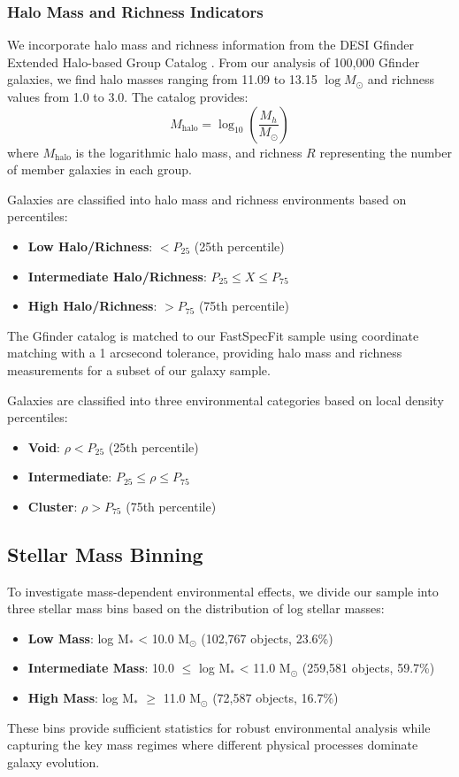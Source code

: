 \documentclass[twocolumn]{aastex701}
\begin{document}
\subsubsection{Halo Mass and Richness Indicators}

We incorporate halo mass and richness information from the DESI Gfinder Extended Halo-based Group Catalog \citep{Yang2021}. From our analysis of 100,000 Gfinder galaxies, we find halo masses ranging from 11.09 to 13.15 $\log M_\odot$ and richness values from 1.0 to 3.0. The catalog provides:
\begin{equation}
M_{\text{halo}} = \log_{10}\left(\frac{M_h}{M_\odot}\right)
\end{equation}
where $M_{\text{halo}}$ is the logarithmic halo mass, and richness $R$ representing the number of member galaxies in each group.

Galaxies are classified into halo mass and richness environments based on percentiles:
\begin{itemize}
\item \textbf{Low Halo/Richness}: $< P_{25}$ (25th percentile)
\item \textbf{Intermediate Halo/Richness}: $P_{25} \leq X \leq P_{75}$
\item \textbf{High Halo/Richness}: $> P_{75}$ (75th percentile)
\end{itemize}

The Gfinder catalog is matched to our FastSpecFit sample using coordinate matching with a 1 arcsecond tolerance, providing halo mass and richness measurements for a subset of our galaxy sample.

Galaxies are classified into three environmental categories based on local density percentiles:
\begin{itemize}
\item \textbf{Void}: $\rho < P_{25}$ (25th percentile)
\item \textbf{Intermediate}: $P_{25} \leq \rho \leq P_{75}$
\item \textbf{Cluster}: $\rho > P_{75}$ (75th percentile)
\end{itemize}

\subsection{Stellar Mass Binning}
To investigate mass-dependent environmental effects, we divide our sample into three stellar mass bins based on the distribution of log stellar masses:
\begin{itemize}
\item \textbf{Low Mass}: log M$_*$ < 10.0 M$_\odot$ (102,767 objects, 23.6\%)
\item \textbf{Intermediate Mass}: 10.0 $\leq$ log M$_*$ < 11.0 M$_\odot$ (259,581 objects, 59.7\%)
\item \textbf{High Mass}: log M$_*$ $\geq$ 11.0 M$_\odot$ (72,587 objects, 16.7\%)
\end{itemize}
These bins provide sufficient statistics for robust environmental analysis while capturing the key mass regimes where different physical processes dominate galaxy evolution.
\end{document}
